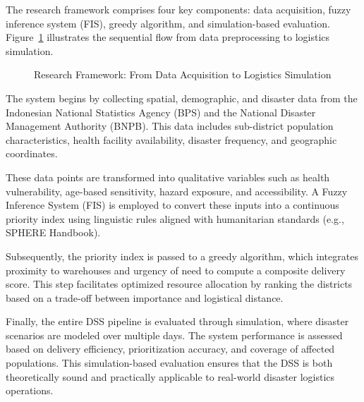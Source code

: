 \documentclass[journal,final,a4paper,twoside,11pt]{IEEEtran}
\begin{document}
The research framework comprises four key components: data acquisition, fuzzy inference system (FIS), greedy algorithm, and simulation-based evaluation. Figure~\ref{fig:research_framework} illustrates the sequential flow from data preprocessing to logistics simulation.

\begin{figure}[htbp]
\centering
{}
\caption{Research Framework: From Data Acquisition to Logistics Simulation}
\label{fig:research_framework}
\end{figure}

The system begins by collecting spatial, demographic, and disaster data from the Indonesian National Statistics Agency (BPS) and the National Disaster Management Authority (BNPB). This data includes sub-district population characteristics, health facility availability, disaster frequency, and geographic coordinates.

These data points are transformed into qualitative variables such as health vulnerability, age-based sensitivity, hazard exposure, and accessibility. A Fuzzy Inference System (FIS) is employed to convert these inputs into a continuous priority index using linguistic rules aligned with humanitarian standards (e.g., SPHERE Handbook).

Subsequently, the priority index is passed to a greedy algorithm, which integrates proximity to warehouses and urgency of need to compute a composite delivery score. This step facilitates optimized resource allocation by ranking the districts based on a trade-off between importance and logistical distance.

Finally, the entire DSS pipeline is evaluated through simulation, where disaster scenarios are modeled over multiple days. The system performance is assessed based on delivery efficiency, prioritization accuracy, and coverage of affected populations. This simulation-based evaluation ensures that the DSS is both theoretically sound and practically applicable to real-world disaster logistics operations.
\end{document}

